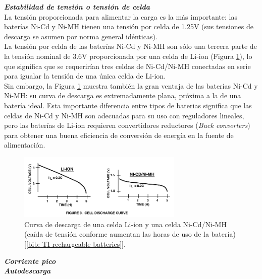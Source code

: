 \documentclass[12pt]{article}
\begin{document}
	\noindent \textit{\textbf{Estabilidad de tensión o tensión de celda}}\\
	
	\noindent La tensión proporcionada para alimentar la carga es la más importante: las baterías Ni-Cd y Ni-MH tienen una tensión por celda de 1.25V (sus tensiones de descarga se asumen por norma general idénticas). \\
	\noindent La tensión por celda de las baterías Ni-Cd y Ni-MH son sólo una tercera parte de la tensión nominal de 3.6V proporcionada por una celda de Li-ion (Figura \ref{fig: curva descarga celdas}), lo que significa que se requerirían tres celdas de Ni-Cd/Ni-MH conectadas en serie para igualar la tensión de una única celda de Li-ion.\\
	\noindent Sin embargo, la Figura \ref{fig: curva descarga celdas} muestra también la gran ventaja de las baterías Ni-Cd y Ni-MH: su curva de descarga es extremadamente plana, próxima a la de una batería ideal. Esta importante diferencia entre tipos de baterias significa que las celdas de Ni-Cd y Ni-MH son adecuadas para su uso con reguladores lineales, pero las baterías de Li-ion requieren convertidores reductores (\textit{Buck converters}) para obtener una buena eficiencia de conversión de energía en la fuente de alimentación. \\
		
	\begin{figure}[h]
		\begin{center}
			\includegraphics[width=0.7\textwidth]{img/cellDischargeCurve_TxInst.png}
			\caption{Curva de descarga de una celda Li-ion y una celda Ni-Cd/Ni-MH (caída de tensión conforme aumentan las horas de uso de la batería) [\ref{bib: TI rechargeable batteries}].}
			\label{fig: curva descarga celdas}
		\end{center}
	\end{figure}
	
	\pagebreak 
	
	\noindent \textit{\textbf{Corriente pico}}\\	
	
	\noindent \textit{\textbf{Autodescarga}}\\	
	
\end{document}
